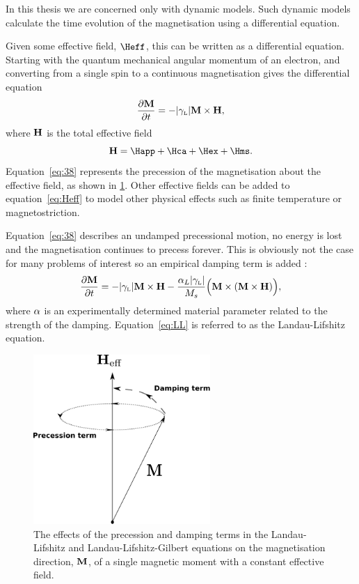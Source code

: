 In this thesis we are concerned only with dynamic models.
Such dynamic models calculate the time evolution of the magnetisation using a differential equation.

Given some effective field, $\Heff$, this can be written as a differential equation. 
Starting with the quantum mechanical angular momentum of an electron, and converting from a single spin to a continuous magnetisation gives the differential equation \cite{Kronmuller2003}
\begin{equation}
  \label{eq:38}
  \frac{\partial \mathbf{M}}{\partial t} = - {\left|{\gamma_{\text{\tiny{L}}}} \right|} \mathbf{M} \times \mathbf{H},
\end{equation}
where $\mathbf{H}$ is the total effective field
\begin{equation}
  \Hv = \Happ + \Hca + \Hex + \Hms.
  \label{eq:Heff}
\end{equation}
Equation~\cref{eq:38} represents the precession of the magnetisation about the effective field, as shown in \cref{fig:LLG-terms}. Other effective fields can be added to equation~\cref{eq:Heff} to model other physical effects such as finite temperature or magnetostriction.

Equation~\cref{eq:38} describes an undamped precessional motion, \ie no energy is lost and the magnetisation continues to precess forever. This is obviously not the case for many problems of interest so an empirical damping term is added \cite{Landau1935}:
\begin{equation}
  \label{eq:LL}
  \frac{\partial \mathbf{M}}{\partial t} = - {\left|{\gamma_{\text{\tiny{L}}}} \right|} \mathbf{M} \times \mathbf{H} - \frac{\alpha_L {\left|{\gamma_{\text{\tiny{L}}}} \right|}}{M_s} \Big( \mathbf{M} \times (\mathbf{M} \times \mathbf{H}) \Big),
\end{equation}
where $\alpha$ is an experimentally determined material parameter related to the strength of the damping. Equation~\cref{eq:LL} is referred to as the Landau-Lifshitz equation.

\begin{figure}
  \centering
  \includegraphics[width=0.6\textwidth]{./images/LLG-terms}
  \caption{The effects of the precession and damping terms in the Landau-Lifshitz and Landau-Lifshitz-Gilbert equations on the magnetisation direction, $\mathbf{M}$, of a single magnetic moment with a constant effective field.}
  \label{fig:LLG-terms}
\end{figure}


